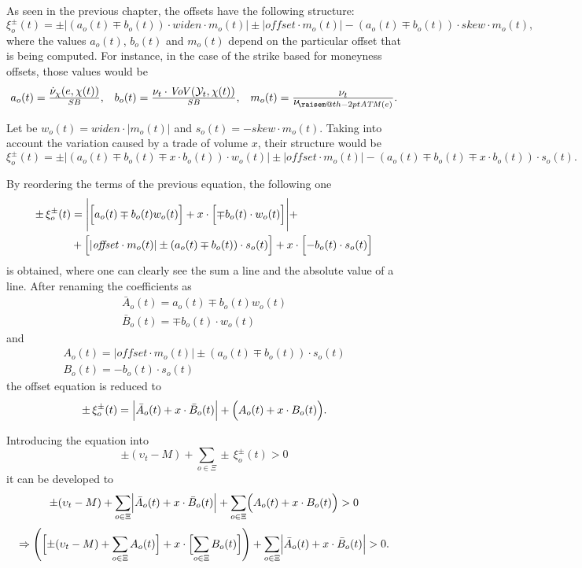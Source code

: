 \documentclass[10pt, a4paper, oneside]{article}
\makeatletter
\def\ds{\displaystyle}
\newcommand{\raisemath}[1]{\mathpalette{\raisem@th{#1}}}
\newcommand{\raisem@th}[3]{\raisebox{#1}{$#2#3$}}
\newcommand{\atm}{\ensuremath{\mathit{ATM}}}
\newcommand{\offsets}{\ensuremath{\Xi}}
\newcommand{\vega}{\ensuremath{\nu}}
\newcommand{\atmvega}{\ensuremath{{\vega_{\!\raisemath{-2pt}{\atm(e)}}}}}
\newcommand{\price}{\ensuremath{\upsilon}}
\newcommand{\yte}{\ensuremath{\mathcal{Y}}}
\newcommand{\nvega}{\ensuremath{\dot{\vega}}}
\newcommand{\nvegam}{\ensuremath{{\nvega_\moneyness}}}
\newcommand{\moneyness}{\ensuremath{\chi}}
\newcommand{\VoV}{\ensuremath{\mathit{Vo\!V}}}
\newcommand{\widen}{\ensuremath{\mathit{widen}}}
\newcommand{\skw}{\ensuremath{\mathit{skew}}}
\newcommand{\offset}{\ensuremath{\mathit{offset}}}
\makeatother
\begin{document}
\noindent As seen in the previous chapter, the offsets have the following structure:
\[\xi^{\pm}_o(t)=\pm\left|(a_o(t)\mp b_o(t))\cdot\widen\cdot m_o(t)\right| \pm \left|\offset\cdot m_o(t)\right| - (a_o(t)\mp b_o(t))\cdot\skw\cdot m_o(t),\]
where the values $a_o(t)$, $b_o(t)$ and $m_o(t)$ depend on the particular offset that is being computed. For instance, in the case of the strike based for moneyness offsets, those values would be
\[\begin{matrix} a_o(t)=\frac{\ds\nvegam(e, \moneyness(t))}{SB}, & b_o(t)=\frac{\ds\vega_t\cdot\VoV(\yte_t, \moneyness(t))}{SB}, & m_o(t)=\frac{\ds\vega_t}{\ds\atmvega}.\end{matrix}\]

\noindent Let be $w_o(t)=\widen\cdot |m_o(t)|$ and $s_o(t)=-\skw\cdot m_o(t)$. Taking into account the variation caused by a trade of volume $x$, their structure would be
\[\xi^{\pm}_o(t)=\pm\left|(a_o(t)\mp b_o(t)\mp x\cdot b_o(t))\cdot w_o(t)\right| \pm \left|\offset\cdot m_o(t)\right| - (a_o(t)\mp b_o(t)\mp x\cdot b_o(t))\cdot s_o(t).\]

\noindent By reordering the terms of the previous equation, the following one
\begin{align*}
  \pm\,\xi^{\pm}_o(t)&=\Biggl|\Bigl[a_o(t)\mp b_o(t)w_o(t)\Bigr] + x\cdot\Bigl[\mp b_o(t)\cdot w_o(t)\Bigr]\Biggr| + \\
  & + \Bigl[\left|\offset\cdot m_o(t)\right|\pm (a_o(t)\mp b_o(t))\cdot s_o(t)\Bigr] + x \cdot \Bigl[-b_o(t)\cdot s_o(t)\Bigr]
\end{align*}
is obtained, where one can clearly see the sum a line and the absolute value of a line. After renaming the coefficients as
\[ \begin{matrix} \bar{A}_o(t)=a_o(t)\mp b_o(t)w_o(t) \\ \bar{B}_o(t)=\mp b_o(t)\cdot w_o(t) \end{matrix} \]
and
\[ \begin{matrix} A_o(t)=\left|\offset\cdot m_o(t)\right|\pm (a_o(t)\mp b_o(t))\cdot s_o(t) \\ B_o(t)=-b_o(t)\cdot s_o(t) \end{matrix} \]
the offset equation is reduced to
\[ \pm\,\xi^{\pm}_o(t)=\Bigl|\bar{A}_o(t) + x\cdot\bar{B}_o(t)\Bigr| + \Bigl(A_o(t) + x \cdot B_o(t)\Bigr). \]

\noindent Introducing the equation into
\[\pm(\price_t-M)+\ds\sum_{o\in\offsets}\pm\,\xi^{\pm}_o(t) > 0\]
it can be developed to
\[\pm(\price_t-M)+\ds\sum_{o\in\offsets}\Bigl|\bar{A}_o(t) + x\cdot\bar{B}_o(t)\Bigr| + \sum_{o\in\offsets}\Bigl(A_o(t) + x \cdot B_o(t)\Bigr) > 0\]
\[\Rightarrow \ds\Biggl(\Bigl[\pm(\price_t-M)+\sum_{o\in\offsets}A_o(t)\Bigr] + x\cdot\Bigl[\sum_{o\in\offsets}B_o(t)\Bigr]\Biggr) + \sum_{o\in\offsets}\Bigl|\bar{A}_o(t) + x\cdot\bar{B}_o(t)\Bigr| > 0.\]
\end{document}
